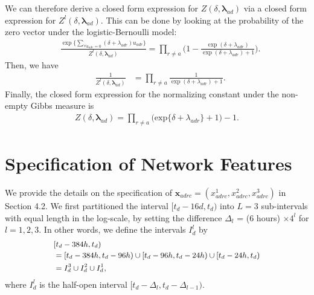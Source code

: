 \documentclass{article}
\begin{document}
 	 We can therefore derive a closed form expression for $Z(\delta,\boldsymbol{\lambda}_{ad})$ via a closed form expression for $Z^{l}(\delta,\boldsymbol{\lambda}_{ad})$. This can be done by looking at the probability of the zero vector under the logistic-Bernoulli model:
 	 \begin{equation*}
 	 	\begin{aligned}
 	 		&\frac{\exp\Big\{ \sum\limits_{\forall u_{adr}=0}(\delta+\lambda_{adr})u_{adr} \Big\}}{Z^{l}(\delta,\boldsymbol{\lambda}_{ad})}= \prod_{r \neq a}   \Big(1-\frac{ \exp{(\delta+\lambda_{adr})}}{\exp{(\delta+\lambda_{adr})} + 1}\Big).
 	 	\end{aligned}  
 	 \end{equation*}
 	 Then, we have 
 	 \begin{equation*}
 	 	\begin{aligned}
 	 		& \frac{1}{Z^{l}(\delta,\boldsymbol{\lambda}_{ad})} &= \prod\limits_{r \neq a}\frac{1}{ \exp(\delta+\lambda_{adr})+ 1}.
 	 	\end{aligned}  
 	 \end{equation*}
 	 Finally, the closed form expression for the normalizing constant under the non-empty Gibbs measure is  \begin{equation*}
 	 	\begin{aligned}Z(\delta,\boldsymbol{\lambda}_{ad}) = \prod_{r \neq a } \big(\mbox{exp}\{\delta+\lambda_{adr}\} + 1\big)-1.
 	 	\end{aligned}  
 	 \end{equation*}
 	 
\iffalse
 \section{Specification of Network Features}\label{sec:Specification of Network Features}
We provide the details on the specification of $\boldsymbol{x}_{adrc} = ({x}^1_{adrc}, {x}^2_{adrc}, {x}^3_{adrc})$ in Section 4.2. We first partitioned the interval $[t_d-16d, t_d)$ into $L=3$ sub-intervals with equal length in the log-scale, by setting the difference $\Delta_l$ = (6 hours) $\times  4^l$ for $l=1,2,3$. In other words, we define the intervals $I_d^l$ by 
 \begin{equation*}
 \footnotesize
 \begin{aligned}
 &[t_d-384h,t_d) \\&=[t_d-384h, t_d-96h) \cup [t_d-96h, t_d-24h)\cup [t_d-24h, t_d)
 \\&=I_d^{3}\cup  I_d^{2}\cup I_d^{1},
 \end{aligned}
 \end{equation*}
 where $I_{d}^{l} $ is the half-open interval $[t_d-\Delta_l, t_d-\Delta_{l-1})$. 
 
\end{document}
